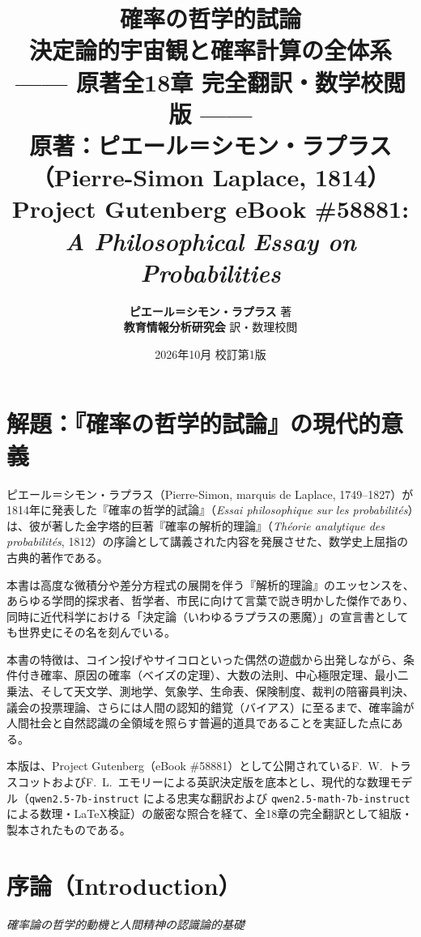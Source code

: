 \documentclass[a4paper,11pt,openany]{ltjsbook}
\title{\Huge\textbf{確率の哲学的試論}\\[4mm]
\huge\textbf{決定論的宇宙観と確率計算の全体系}\\[6mm]
\Large\textbf{—— 原著全18章 完全翻訳・数学校閲版 ——}\\[5mm]
\large 原著：ピエール＝シモン・ラプラス（Pierre-Simon Laplace, 1814）\\[2mm]
\normalsize Project Gutenberg eBook \#58881: \textit{A Philosophical Essay on Probabilities}}
\author{\textbf{ピエール＝シモン・ラプラス} 著\\[2mm]
\textbf{教育情報分析研究会} 訳・数理校閲}
\date{2026年10月 校訂第1版}
\begin{document}
\maketitle

\frontmatter

\chapter*{解題：『確率の哲学的試論』の現代的意義}

ピエール＝シモン・ラプラス（Pierre-Simon, marquis de Laplace, 1749--1827）が1814年に発表した『確率の哲学的試論』（\textit{Essai philosophique sur les probabilités}）は、彼が著した金字塔的巨著『確率の解析的理論』（\textit{Théorie analytique des probabilités}, 1812）の序論として講義された内容を発展させた、数学史上屈指の古典的著作である。

本書は高度な微積分や差分方程式の展開を伴う『解析的理論』のエッセンスを、あらゆる学問的探求者、哲学者、市民に向けて言葉で説き明かした傑作であり、同時に近代科学における「決定論（いわゆるラプラスの悪魔）」の宣言書としても世界史にその名を刻んでいる。

本書の特徴は、コイン投げやサイコロといった偶然の遊戯から出発しながら、条件付き確率、原因の確率（ベイズの定理）、大数の法則、中心極限定理、最小二乗法、そして天文学、測地学、気象学、生命表、保険制度、裁判の陪審員判決、議会の投票理論、さらには人間の認知的錯覚（バイアス）に至るまで、確率論が人間社会と自然認識の全領域を照らす普遍的道具であることを実証した点にある。

本版は、Project Gutenberg（eBook \#58881）として公開されているF.~W.~トラスコットおよびF.~L.~エモリーによる英訳決定版を底本とし、現代的な数理モデル（\texttt{qwen2.5-7b-instruct} による忠実な翻訳および \texttt{qwen2.5-math-7b-instruct} による数理・LaTeX検証）の厳密な照合を経て、全18章の完全翻訳として組版・製本されたものである。

\tableofcontents

\mainmatter


\chapter{序論（Introduction）}
\label{ch:i}

\begin{center}
\large\textit{確率論の哲学的動機と人間精神の認識論的基礎}
\end{center}
\vspace{4mm}
\end{document}
